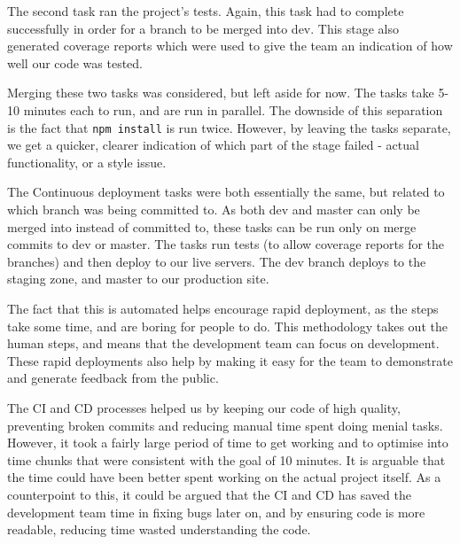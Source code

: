 \documentclass{l3proj}
\begin{document}
The second task ran the project's tests. Again, this task had to complete successfully in 
 order for a branch to be merged into dev. This stage also generated coverage reports which 
 were used to give the team an indication of how well our code was tested.
 
 
 
Merging these two tasks was considered, but left aside for now. The tasks take 5-10 minutes 
 each to run, and are run in parallel. The downside of this separation is the fact that \texttt{npm install} 
 is run twice. However, by leaving the tasks separate, we get a quicker, clearer indication
 of which part of the stage failed - actual functionality, or a style issue.

 

The Continuous deployment tasks were both essentially the same, but related to which branch was being 
 committed to. As both dev and master can only be merged into instead of committed to, these tasks can 
 be run only on merge commits to dev or master. The tasks run tests (to allow coverage reports for the branches) 
 and then deploy to our live servers. The dev branch deploys to the staging zone, and 
 master to our production site. 
 
The fact that this is automated helps encourage rapid deployment, as the steps take some time, and are 
 boring for people to do. This methodology takes out the human steps, and means that the development team 
 can focus on development. These rapid deployments also help by making it easy for the team to demonstrate 
 and generate feedback from the public.


The CI and CD processes helped us by keeping our code of high quality, preventing broken commits and reducing 
 manual time spent doing menial tasks. However, it took a fairly large period of time to get working and to
 optimise into time chunks that were consistent with the goal of 10 minutes. It is arguable that the time 
 could have been better spent working on the actual project itself. As a counterpoint to this, it could be
 argued that the CI and CD has saved the development team time in fixing bugs later on, and by ensuring code is more
 readable, reducing time wasted understanding the code.

\newpage
\end{document}
